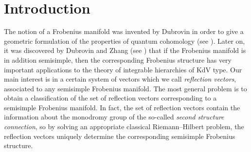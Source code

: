 \documentclass[pdftex]{sigma}
\numberwithin{equation}{section}
\begin{document}
\allowdisplaybreaks

\newcommand{\arXivNumber}{2304.04365}

\renewcommand{\PaperNumber}{029}

\FirstPageHeading








\section{Introduction}

The notion of a Frobenius manifold was invented by Dubrovin in order
to give a geometric formulation of the properties of quantum
cohomology (see \cite{Du}). Later on, it was discovered by Dubrovin and
Zhang (see \cite{DuZ}) that if the Frobenius manifold is in addition semisimple, then
the corresponding Frobenius structure has very important applications
to the theory of integrable hierarchies of KdV type. Our main interest
is in a certain system of vectors which we call {\em reflection
 vectors}, associated to any semisimple Frobenius manifold. The most general
problem is to obtain a classification of the set of reflection vectors
corresponding to a semisimple Frobenius manifold. In fact, the set of
reflection vectors contain the information about the monodromy group
of the so-called {\em second structure connection}, so by solving an
appropriate classical Riemann--Hilbert problem, the reflection vectors uniquely
determine the corresponding semisimple Frobenius structure.
\end{document}
